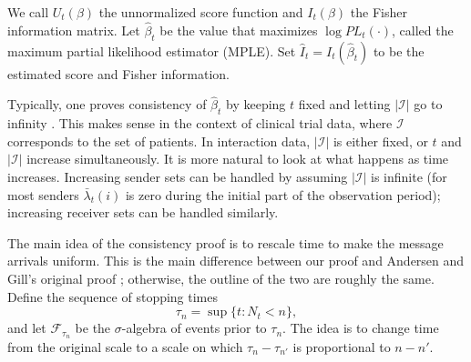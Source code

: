 \documentclass[aoas,preprint]{imsart}
\begin{document}
We call $U_t(\beta)$ the unnormalized score function and $I_t(\beta)$
the Fisher information matrix.  Let $\hat \beta_t$ be the value that
maximizes $\log \mathit{PL}_t(\cdot)$, called the maximum partial
likelihood estimator (MPLE).  Set $\hat I_t = I_t(\hat \beta_t)$ to be
the estimated score and Fisher information.

Typically, one proves consistency of $\hat \beta_t$ by keeping $t$ fixed
and letting $|\mathcal{I}|$ go to infinity
\cite{andersen1993statistical,andersen1982cox,cook2007statistical,fleming1991counting,
martinussen2006dynamic}.  This makes sense in the context of clinical trial
data, where $\mathcal{I}$ corresponds to the set of patients.  In interaction
data, $|\mathcal{I}|$ is either fixed, or $t$ and $|\mathcal{I}|$ increase
simultaneously.  It is more natural to look at what happens as time increases.
Increasing sender sets can be handled by assuming $|\mathcal{I}|$ is infinite
(for most senders $\bar \lambda_t(i)$ is zero during the initial
part of the observation period); increasing receiver sets can be
handled similarly.

The main idea of the consistency proof is to rescale time to make the message
arrivals uniform.  This is the main difference between our proof and
Andersen and Gill's original proof \cite{andersen1982cox}; otherwise, the
outline of the two are roughly the same.  Define the sequence of stopping
times
\begin{equation}\label{E:message-times}
    \tau_n = \sup\{ t : N_t < n \},
\end{equation}
and let $\mathcal{F}_{\tau_n}$ be the $\sigma$-algebra of events prior to
$\tau_n$. The idea is to change time from the original scale to a scale on
which $\tau_{n} - \tau_{n'}$ is proportional to $n - n'$.
\end{document}
